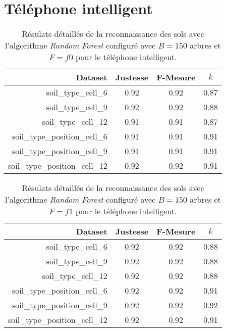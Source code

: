 \section{Téléphone intelligent}

\begin{table}[H]\renewcommand{\arraystretch}{0.5}
	\centering
	\caption{Résulats détaillés de la reconnaissance des sols avec l'algorithme \textit{Random Forest} configuré avec $B=150$ arbres et $F=f0$ pour le téléphone intelligent.}
	\label{tab:rf-150-f0-cell}
	\begin{tabular}{@{}rccc@{}}
		\toprule
			\textbf{Dataset} & \textbf{Justesse} & \textbf{F-Mesure} & \textbf{$k$} \\
		\midrule
			soil\_type\_cell\_6 & 0.92 & 0.92 & 0.87 \\
			soil\_type\_cell\_9 & 0.92 & 0.92 & 0.88 \\
			soil\_type\_cell\_12 & 0.91 & 0.91 & 0.87 \\
			soil\_type\_position\_cell\_6 & 0.91 & 0.91 & 0.91 \\
			soil\_type\_position\_cell\_9 & 0.91 & 0.91 & 0.91 \\
			soil\_type\_position\_cell\_12 & 0.92 & 0.92 & 0.91 \\
		\bottomrule
	\end{tabular}
\end{table}

\begin{table}[H]\renewcommand{\arraystretch}{0.5}
	\centering
	\caption{Résulats détaillés de la reconnaissance des sols avec l'algorithme \textit{Random Forest} configuré avec $B=150$ arbres et $F=f1$ pour le téléphone intelligent.}
	\label{tab:rf-150-f1-cell}
	\begin{tabular}{@{}rccc@{}}
		\toprule
			\textbf{Dataset} & \textbf{Justesse} & \textbf{F-Mesure} & \textbf{$k$} \\
		\midrule
			soil\_type\_cell\_6 & 0.92 & 0.92 & 0.88 \\
			soil\_type\_cell\_9 & 0.92 & 0.92 & 0.88 \\
			soil\_type\_cell\_12 & 0.92 & 0.92 & 0.88 \\
			soil\_type\_position\_cell\_6 & 0.92 & 0.92 & 0.91 \\
			soil\_type\_position\_cell\_9 & 0.92 & 0.92 & 0.92 \\
			soil\_type\_position\_cell\_12 & 0.92 & 0.92 & 0.91 \\
		\bottomrule
	\end{tabular}
\end{table}

